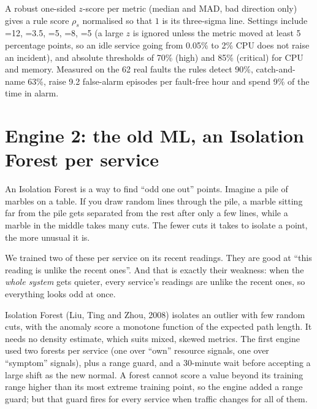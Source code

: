 \begin{techbox}
A robust one-sided $z$-score per metric (median and MAD, bad direction only) gives a rule score $\rho_s$ normalised so that $1$ is its three-sigma line. Settings include =12, =3.5, =5, =8, =5 (a large $z$ is ignored unless the metric moved at least 5 percentage points, so an idle service going from 0.05\% to 2\% CPU does not raise an incident), and absolute thresholds of 70\% (high) and 85\% (critical) for CPU and memory. Measured on the 62 real faults the rules detect 90\%, catch-and-name 63\%, raise 9.2 false-alarm episodes per fault-free hour and spend 9\% of the time in alarm.
\end{techbox}

\section{Engine 2: the old ML, an Isolation Forest per service}
\begin{simplebox}
An Isolation Forest is a way to find ``odd one out'' points. Imagine a pile of marbles on a table. If you draw random lines through the pile, a marble sitting far from the pile gets separated from the rest after only a few lines, while a marble in the middle takes many cuts. The fewer cuts it takes to isolate a point, the more unusual it is.

We trained two of these per service on its recent readings. They are good at ``this reading is unlike the recent ones''. And that is exactly their weakness: when the \emph{whole system} gets quieter, every service's readings are unlike the recent ones, so everything looks odd at once.
\end{simplebox}

\begin{techbox}
Isolation Forest (Liu, Ting and Zhou, 2008) isolates an outlier with few random cuts, with the anomaly score a monotone function of the expected path length. It needs no density estimate, which suits mixed, skewed metrics. The first engine used two forests per service (one over ``own'' resource signals, one over ``symptom'' signals), plus a range guard, and a 30-minute wait before accepting a large shift as the new normal. A forest cannot score a value beyond its training range higher than its most extreme training point, so the engine added a range guard; but that guard fires for every service when traffic changes for all of them.
\end{techbox}

